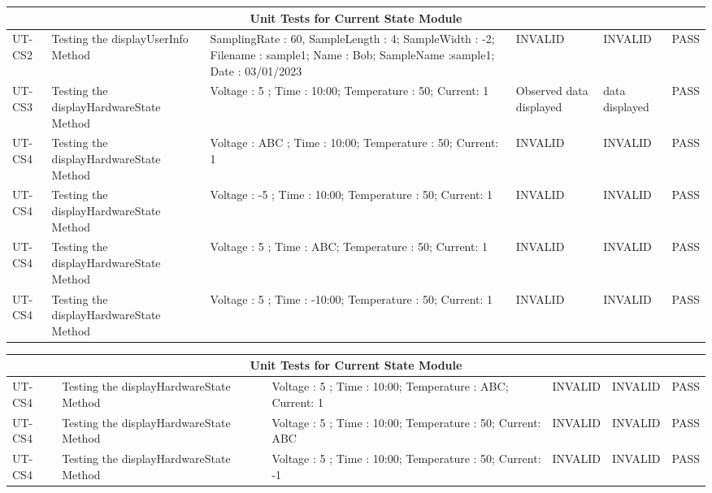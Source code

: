 \documentclass[12pt, titlepage]{article}
\begin{document}
  \newpage
  \begin{tabular}{ |p{1.4cm}||p{2cm}|p{2.5cm}|p{3cm}|p{3cm}|p{1.5cm}|}
    \hline
    \multicolumn{6}{|c|}{Unit Tests for Current State Module} \\
    \hline
    UT-CS2   & Testing the displayUserInfo Method  & SamplingRate : 60, SampleLength : 4; SampleWidth : -2; Filename : sample1; Name : Bob; SampleName :sample1; Date : 03/01/2023 & INVALID & INVALID & PASS \\ 
    \hline
    UT-CS3   & Testing the displayHardwareState Method  & Voltage : 5 ; Time : 10:00; Temperature : 50; Current: 1 & Observed data displayed & data displayed& PASS \\
    \hline
    UT-CS4   & Testing the displayHardwareState Method  & Voltage : ABC ; Time : 10:00; Temperature : 50; Current: 1 & INVALID & INVALID& PASS \\
    \hline
    UT-CS4   & Testing the displayHardwareState Method  & Voltage : -5 ; Time : 10:00; Temperature : 50; Current: 1 & INVALID & INVALID& PASS \\
    \hline
    UT-CS4   & Testing the displayHardwareState Method  & Voltage : 5 ; Time : ABC; Temperature : 50; Current: 1 & INVALID & INVALID& PASS \\
    \hline
    UT-CS4   & Testing the displayHardwareState Method  & Voltage : 5 ; Time : -10:00; Temperature : 50; Current: 1 & INVALID & INVALID& PASS \\
    \hline
  \end{tabular}
  \newpage
  \begin{tabular}{ |p{1.4cm}||p{2cm}|p{2.5cm}|p{3cm}|p{3cm}|p{1.5cm}|}
    \hline
    \multicolumn{6}{|c|}{Unit Tests for Current State Module} \\
    \hline
    UT-CS4   & Testing the displayHardwareState Method  & Voltage : 5 ; Time : 10:00; Temperature : ABC; Current: 1 & INVALID & INVALID& PASS \\
    \hline
    UT-CS4   & Testing the displayHardwareState Method  & Voltage : 5 ; Time : 10:00; Temperature : 50; Current: ABC & INVALID & INVALID& PASS \\
    \hline
    UT-CS4   & Testing the displayHardwareState Method  & Voltage : 5 ; Time : 10:00; Temperature : 50; Current: -1 & INVALID & INVALID& PASS \\
    \hline
   \end{tabular}

\pagebreak
\end{document}
